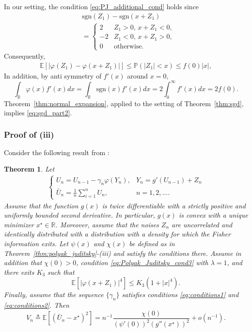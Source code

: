 \documentclass[letterpaper, 11pt]{IEEEtran}      %
\newtheorem{thm}{\bf{Theorem}}
\newcommand{\ex}[1]{\ensuremath{\mathbb{E}\left[ #1\right]}}
\newcommand{\sgn}{\mathrm{sgn} }
\newcommand{\Prob}{\mathbb{P} }
\begin{document}
In our setting, the condition \eqref{eq:PJ_additional_cond} holds since
\begin{align*}
& %
\sgn(Z_1) - \sgn(x + Z_1) \\
& = \begin{cases}
2 & Z_1 > 0,\, x+Z_1<0, \\
-2 & Z_1 <0, \, x+Z_1>0, \\
0 & \text{otherwise}. 
\end{cases}
\end{align*}
Consequently, 
\begin{align*}
\ex{ \left| \varphi(Z_1) - \varphi(x+Z_1) \right| }  \leq \Prob\left( |Z_1| < x  \right) \leq f(0) |x|, 
\end{align*}
In addition, by anti symmetry of $f'(x)$ around $x=0$, 
\[
\int_{\mathbb R} \varphi(x) f'(x) dx = \int_{\mathbb R} \sgn(x) f'(x) dx = 2\int_0^\infty f'(x) dx = 2f(0). 
\]
Theorem~\ref{thm:normal_expansion}, applied to the setting of Theorem~\ref{thm:sgd}, implies \eqref{eq:sgd_part2}. 

\subsubsection*{Proof of (iii)}
Consider the following result from \cite{polyak1990new}:
\begin{thm}{\cite[Thm. 2]{polyak1990new}} \label{thm:polyak_new}
Let
\begin{align} \label{eq:polyak_new_measurements}
\begin{cases}
U_n = U_{n-1} - \gamma_n \varphi(Y_n), & Y_n = g'(U_{n-1})+Z_n \\
\bar{U}_n= \frac{1}{n} \sum_{i=1}^n U_n, & n=1,2,\ldots.
\end{cases}
\end{align}
Assume that the function $g(x)$ is twice differentiable with a strictly positive and uniformly bounded second derivative. In particular, $g(x)$ is convex with a unique minimizer $x^\star \in \mathbb R$. Moreover, assume that the noises $Z_n$ are uncorrelated and identically distributed with a distribution with a density for which the Fisher information exits. Let $\psi(x)$ and $\chi(x)$ be defined as in Theorem~\ref{thm:polyak_juditsky}-(iii) and satisfy the conditions there. Assume in addition that $\chi(0)>0$, condition \eqref{eq:Polyak_Juditsky_cond3} with $\lambda = 1$, 
and there exits $K_3$ such that 
\[
\mathbb E \left[ | \varphi(x+Z_1) |^4 \right] \leq K_3(1+|x|^4). 
\]
Finally, assume that the sequence $\{\gamma_n \}$ satisfies conditions \eqref{eq:conditions1} and \eqref{eq:conditions2}. Then
\[
V_n \triangleq \mathbb E \left[ \left(\bar{U}_n-x^\star \right)^2 \right] = n^{-1}\frac{\chi(0)} { (\psi'(0))^2 (g''(x^\star))^2 } + o(n^{-1}).
\]
\end{thm}
\end{document}
